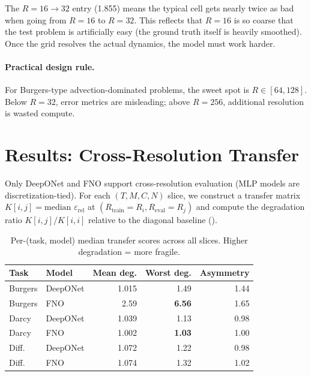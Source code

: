 \documentclass[11pt]{article}
\newcommand{\Reval}{R_{\mathrm{eval}}}
\newcommand{\Rtrain}{R_{\mathrm{train}}}
\newcommand{\relLtwo}{\varepsilon_{\mathrm{rel}}}
\newcommand{\fnoWorstDeg}{6.56}
\newcommand{\fnoMeanDeg}{2.59}
\newcommand{\deeponetWorstDeg}{1.49}
\newcommand{\darcyFnoWorstDeg}{1.03}
\begin{document}
\noindent
The $R{=}16 \to 32$ entry (1.855) means the typical cell gets nearly
twice as bad when going from $R{=}16$ to $R{=}32$. This reflects
that $R{=}16$ is so coarse that the test problem is artificially
easy (the ground truth itself is heavily smoothed). Once the grid
resolves the actual dynamics, the model must work harder.

\paragraph{Practical design rule.}
For Burgers-type advection-dominated problems, the sweet spot is
$R \in [64, 128]$. Below $R{=}32$, error metrics are misleading;
above $R{=}256$, additional resolution is wasted compute.


\section{Results: Cross-Resolution Transfer}
\label{sec:transfer}

Only DeepONet and FNO support cross-resolution evaluation (MLP models
are discretization-tied). For each $(T, M, C, N)$ slice, we construct
a transfer matrix $K[i,j] = \text{median } \relLtwo$ at
$(\Rtrain = R_i, \Reval = R_j)$ and compute the degradation ratio
$K[i,j] / K[i,i]$ relative to the diagonal baseline
().

\begin{table}[h]
\centering
\caption{Per-(task, model) median transfer scores across all slices.
Higher degradation = more fragile.}
\label{tab:transfer-scores}
\begin{tabular}{@{}llrrr@{}}
\toprule
\textbf{Task} & \textbf{Model} & \textbf{Mean deg.} &
\textbf{Worst deg.} & \textbf{Asymmetry} \\
\midrule
Burgers & DeepONet & 1.015 & \deeponetWorstDeg{} & 1.44 \\
Burgers & FNO      & \fnoMeanDeg{} & \textbf{\fnoWorstDeg{}} & 1.65 \\
Darcy   & DeepONet & 1.039 & 1.13 & 0.98 \\
Darcy   & FNO      & 1.002 & \textbf{\darcyFnoWorstDeg{}} & 1.00 \\
Diff.   & DeepONet & 1.072 & 1.22 & 0.98 \\
Diff.   & FNO      & 1.074 & 1.32 & 1.02 \\
\bottomrule
\end{tabular}
\end{table}
\end{document}
